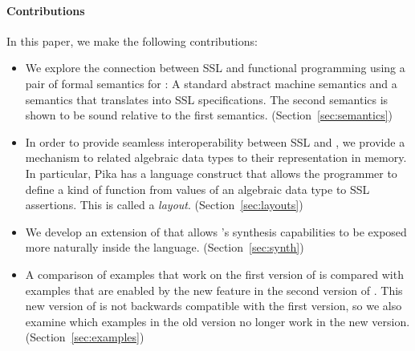 \paragraph{Contributions} In this paper, we make the following contributions:
\begin{itemize}
  \item We explore the connection between SSL and functional programming using a pair of formal semantics for \Pika: A standard abstract machine semantics and a
    semantics that translates \Pika{} into SSL specifications. The second semantics is shown to be sound relative to the first semantics. (Section~\ref{sec:semantics})

  \item In order to provide seamless interoperability between SSL and \Pika, we provide a mechanism to related algebraic data types to their representation in memory. In particular, Pika has a language construct that allows the programmer to define a kind of function from values of an algebraic data type to SSL assertions. This is called a \textit{layout}. (Section~\ref{sec:layouts})

  \item We develop an extension of \Pika{} that allows \SuSLik's synthesis capabilities to be exposed more naturally inside the \Pika{} language. (Section~\ref{sec:synth})

  \item A comparison of examples that work on the first version of \Pika{} is compared with examples that are enabled by the new feature in the second version of \Pika. This new version of \Pika{} is not backwards compatible with the first version, so we also examine which examples in the old version no longer work in the new version. (Section~\ref{sec:examples})
\end{itemize}


